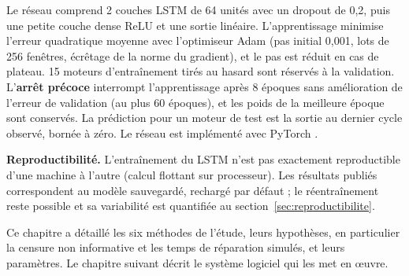 Le réseau \cite{hochreiter1997,zheng2017} comprend 2 couches LSTM de 64 unités avec un dropout de 0,2, puis une petite couche dense ReLU et une sortie linéaire. L'apprentissage minimise l'erreur quadratique moyenne avec l'optimiseur Adam \cite{kingma2015} (pas initial 0,001, lots de 256 fenêtres, écrêtage de la norme du gradient), et le pas est réduit en cas de plateau. 15 moteurs d'entraînement tirés au hasard sont réservés à la validation. L'\textbf{arrêt précoce} interrompt l'apprentissage après 8 époques sans amélioration de l'erreur de validation (au plus 60 époques), et les poids de la meilleure époque sont conservés. La prédiction pour un moteur de test est la sortie au dernier cycle observé, bornée à zéro. Le réseau est implémenté avec PyTorch \cite{paszke2019}.

\textbf{Reproductibilité.} L'entraînement du LSTM n'est pas exactement reproductible d'une machine à l'autre (calcul flottant sur processeur). Les résultats publiés correspondent au modèle sauvegardé, rechargé par défaut ; le réentraînement reste possible et sa variabilité est quantifiée au section~\ref{sec:reproductibilite}.

\chapconclusion

Ce chapitre a détaillé les six méthodes de l'étude, leurs hypothèses, en particulier la censure non informative et les temps de réparation simulés, et leurs paramètres. Le chapitre suivant décrit le système logiciel qui les met en œuvre.
